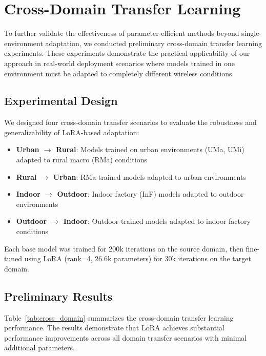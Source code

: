 
\section{Cross-Domain Transfer Learning}

To further validate the effectiveness of parameter-efficient methods beyond single-environment adaptation, we conducted preliminary cross-domain transfer learning experiments. These experiments demonstrate the practical applicability of our approach in real-world deployment scenarios where models trained in one environment must be adapted to completely different wireless conditions.

\subsection{Experimental Design}

We designed four cross-domain transfer scenarios to evaluate the robustness and generalizability of LoRA-based adaptation:

\begin{itemize}
\item \textbf{Urban $\rightarrow$ Rural}: Models trained on urban environments (UMa, UMi) adapted to rural macro (RMa) conditions
\item \textbf{Rural $\rightarrow$ Urban}: RMa-trained models adapted to urban environments
\item \textbf{Indoor $\rightarrow$ Outdoor}: Indoor factory (InF) models adapted to outdoor environments
\item \textbf{Outdoor $\rightarrow$ Indoor}: Outdoor-trained models adapted to indoor factory conditions
\end{itemize}

Each base model was trained for 200k iterations on the source domain, then fine-tuned using LoRA (rank=4, 26.6k parameters) for 30k iterations on the target domain.

\subsection{Preliminary Results}

Table~\ref{tab:cross_domain} summarizes the cross-domain transfer learning performance. The results demonstrate that LoRA achieves substantial performance improvements across all domain transfer scenarios with minimal additional parameters.

